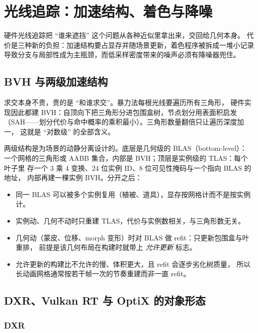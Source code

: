 \documentclass[12pt,a4paper,fontset=fandol]{ctexbook}
\begin{document}
\chapter{光线追踪：加速结构、着色与降噪}
\label{ch:ch13-raytracing}

硬件光线追踪把 ``谁来遮挡'' 这个问题从各种近似里拿出来，交回给几何本身。
代价是三种新的负担：加速结构要占显存并随场景更新，着色程序被拆成一堆小记录
导致分支与局部性成为主瓶颈，而低采样密度带来的噪声必须有降噪器兜住。

\section{BVH 与两级加速结构}

求交本身不贵，贵的是 ``和谁求交''。暴力法每根光线要遍历所有三角形，
硬件实现因此都建 BVH：自顶向下把三角形分进包围盒树，节点划分用表面积启发
（SAH------划分代价与命中概率的乘积最小）。三角形数量翻倍只让遍历深度加一，
这就是 ``对数级'' 的全部含义。

两级结构是为场景的动静分离设计的。底层是几何级的 BLAS（bottom-level）：
一个网格的三角形或 AABB 集合，内部是 BVH；顶层是实例级的 TLAS：每个叶子里
存一个 3 乘 4 变换、24 位实例 ID、8 位可见性掩码与一个指向 BLAS 的地址，
内部再建一棵实例 BVH。分开之后：

\begin{itemize}
\item 同一 BLAS 可以被多个实例复用（植被、道具），显存按网格计而不是按实例计。
\item 实例动、几何不动时只重建 TLAS，代价与实例数相关，与三角形数无关。
\item 几何动（蒙皮、位移、morph 变形）时对 BLAS 做 refit：只更新包围盒与叶重排，
前提是该几何布局在构建时就带上 \emph{允许更新} 标志。
\item 允许更新的构建比不允许的慢、体积更大，且 refit 会逐步劣化树质量，
所以长动画网格通常按若干帧一次的节奏重建而非一直 refit。
\end{itemize}

\section{DXR、Vulkan RT 与 OptiX 的对象形态}

\subsection{DXR}
\end{document}
